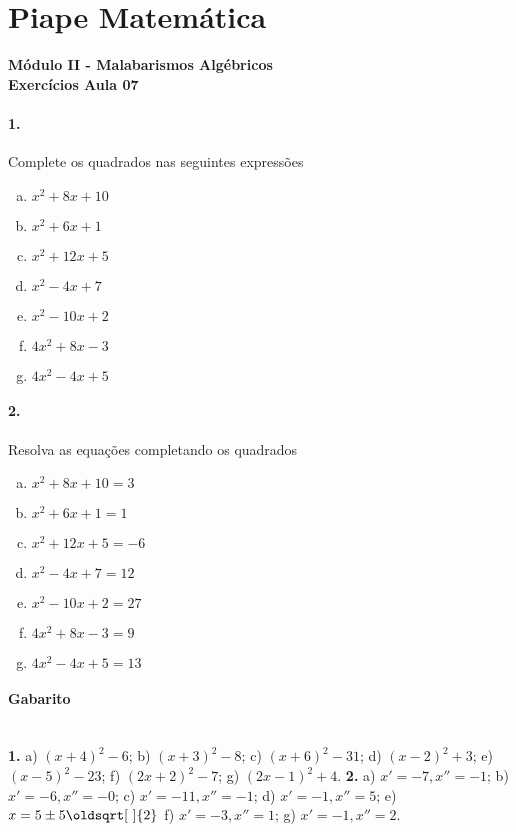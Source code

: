 \documentclass[a4paper,12pt]{article}
\renewcommand*{\sqrt}[2][\ ]{\oldsqrt[#1]{#2}}
\begin{document}
 
  
\section*{Piape Matemática} 
\textbf{Módulo II - Malabarismos Algébricos}\\
\textbf{Exercícios Aula 07}         
\begin{multicols}{2}
\paragraph*{1.} Complete os quadrados nas seguintes expressões
\begin{enumerate}[a)]
\item $x^2 + 8x + 10$ 
\item $x^2 + 6x + 1$
\item $x^2 + 12x + 5$
\item $x^2 - 4x + 7$
\item $x^2 - 10x + 2$
\item $4x^2 + 8x - 3$
\item $4x^2 - 4x + 5$
\end{enumerate}

\paragraph*{2.} Resolva as equações completando os quadrados
\begin{enumerate}[a)]
\item $x^2 + 8x + 10 = 3$
\item $x^2 + 6x + 1 = 1$
\item $x^2 + 12x + 5 = -6$
\item $x^2 - 4x + 7 = 12$ %
\item $x^2 - 10x + 2 = 27$ %
\item $4x^2 + 8x - 3 = 9$ %
\item $4x^2 - 4x + 5 = 13$ %
\end{enumerate}
\vspace*{0cm}
\end{multicols}
 
\vspace*{\fill}
{\footnotesize
\paragraph*{Gabarito} \hspace*{\fill}\\
\textbf{1.} a) $(x+4)^2 - 6$; b) $(x+3)^2 - 8$; c) $(x+6)^2 - 31$; d) $(x-2)^2 + 3$; e) $(x-5)^2 - 23$; f) $(2x+2)^2 - 7$; g) $(2x-1)^2 + 4$.
\textbf{2.} a) $x' = -7, x''=-1$; b) $x' = -6, x''=-0$; c) $x' = -11, x''=-1$; d) $x' = -1, x''=5$; e) $x = 5 \pm 5\sqrt{2}$ f) $x' = -3, x''=1$; g) $x' = -1, x''=2$.
}
\end{document}
